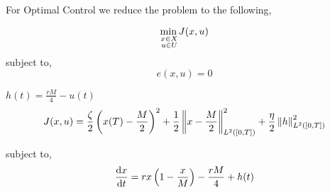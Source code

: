 For Optimal Control we reduce the problem to the following,


\begin{equation}
{\displaystyle {\underset {\substack{x\in X \\ u \in U}}{\min\, }}J(x,u)}
\end{equation}
subject to,
\begin{equation}
	e(x,u)=0
\end{equation}

$h(t)=\frac{rM}{4}-u(t)$
\begin{equation}
	J(x,u)=\frac{\zeta}{2} \left(x(T)-\frac{M}{2}\right)^2+\frac{1}{2}\left\lVert x-\frac{M}{2} \right\rVert^2_{L^2([0,T])}+\frac{\eta}{2}\left\lVert h \right\rVert^2_{L^2([0,T])}
\end{equation}

subject to,
\begin{equation}
	\frac{\mathrm{d} x}{{\mathrm{d} t}}=rx\left(1-\frac{x}{M}\right)-\frac{rM}{4}+h(t)
\end{equation}